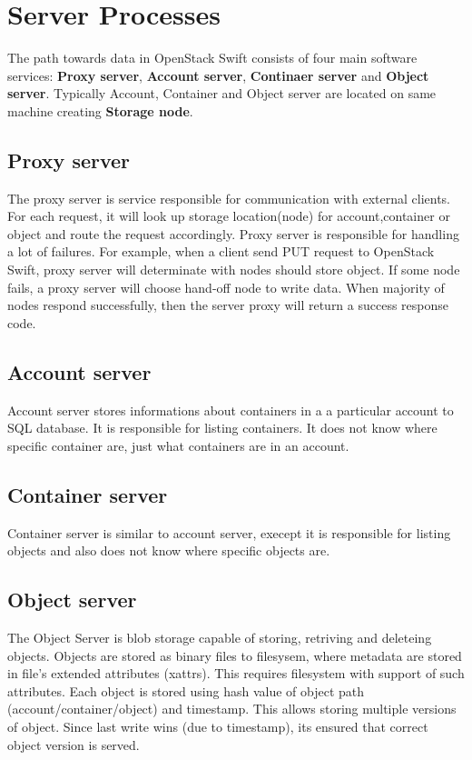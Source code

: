     \section{Server Processes}
    The path towards data in OpenStack Swift consists of four main software services: \textbf{Proxy server}, \textbf{Account server}, \textbf{Continaer server} and \textbf{Object server}. Typically Account, Container and Object server are located on same machine creating \textbf{Storage node}.

    \subsection{Proxy server}
    The proxy server is service responsible for communication with external clients. For each request, it will look up storage location(node) for account,container or object and route the request accordingly\cite{SwiftArchitecturalOverview}. Proxy server is responsible for handling a lot of failures. For example, when a client send PUT request to OpenStack Swift, proxy server will determinate with nodes should store object. If some node fails, a proxy server will choose hand-off node to write data. When majority of nodes respond successfully, then the server proxy will return a success response code\cite{swiftOpenStackSwift}.

    \subsection{Account server}
    Account server stores informations about containers in a a particular account to SQL database. It is responsible for listing containers. It does not know where specific container are, just what containers are in an account\cite{SwiftArchitecturalOverview}.

    \subsection{Container server}
    Container server is similar to account server, execept it is responsible for listing objects and also does not know where specific objects are\cite{SwiftArchitecturalOverview}.

    \subsection{Object server}
    The Object Server is blob storage capable of storing, retriving and deleteing objects. Objects are stored as binary files to filesysem, where metadata are stored in file's extended attributes (xattrs). This requires filesystem with support of such attributes. Each object is stored using hash value of object path (account/container/object) and timestamp. This allows storing multiple versions of object. Since last write wins (due to timestamp), its ensured that correct object version is served\cite{SwiftArchitecturalOverview}.


